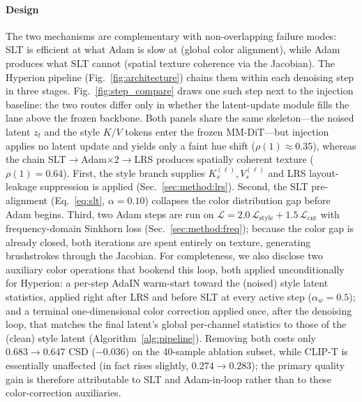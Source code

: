 \paragraph{Design}
The two mechanisms are complementary with non-overlapping failure modes:
SLT is efficient at what Adam is slow at (global color alignment),
while Adam produces what SLT cannot (spatial texture coherence via the Jacobian).
The Hyperion pipeline (Fig.~\ref{fig:architecture}) chains them within each
denoising step in three stages.
Fig.~\ref{fig:step_compare} draws one such step next to the injection
baseline: the two routes differ only in whether the latent-update module fills
the lane above the frozen backbone.
Both panels share the same skeleton---the noised latent $z_t$ and the
style $K/V$ tokens enter the frozen MM-DiT---but injection applies no latent
update and yields only a faint hue shift ($\rho(1){\approx}0.35$), whereas the
chain SLT${\to}$Adam${\times}2{\to}$LRS produces spatially coherent texture
($\rho(1){=}0.64$).
First, the style branch supplies $K_s^{(\ell)}, V_s^{(\ell)}$ and LRS
layout-leakage suppression is applied (Sec.~\ref{sec:method:lrs}).
Second, the SLT pre-alignment (Eq.~\ref{eq:slt}, $\alpha=0.10$)
collapses the color distribution gap before Adam begins.
Third, two Adam steps are run on
$\mathcal{L} = 2.0\,\mathcal{L}_\text{style} + 1.5\,\mathcal{L}_\text{cnt}$
with frequency-domain Sinkhorn loss (Sec.~\ref{sec:method:freq}); because
the color gap is already closed, both iterations are spent entirely on texture,
generating brushstrokes through the Jacobian.
For completeness, we also disclose two auxiliary color operations that
bookend this loop, both applied unconditionally for Hyperion: a per-step
AdaIN warm-start toward the (noised) style latent statistics, applied right
after LRS and before SLT at every active step ($\alpha_w=0.5$); and a
terminal one-dimensional color correction applied once, after the denoising
loop, that matches the final latent's global per-channel statistics to those
of the (clean) style latent (Algorithm~\ref{alg:pipeline}). Removing both
costs only $0.683\!\to\!0.647$ CSD ($-0.036$) on the 40-sample ablation
subset, while CLIP-T is essentially unaffected (in fact rises slightly,
$0.274\!\to\!0.283$); the primary quality gain is therefore attributable to
SLT and Adam-in-loop rather than to these color-correction auxiliaries.

